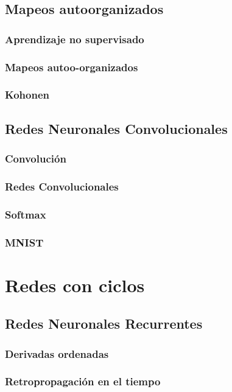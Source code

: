 \documentclass[12pt,openany]{book}
\begin{document}
\chapter{Mapeos autoorganizados}
\section{Aprendizaje no supervisado}
\section{Mapeos autoo-organizados}
\section{Kohonen}

\chapter{Redes Neuronales Convolucionales}
\section{Convolución}
\section{Redes Convolucionales}
\section{Softmax}
\section{MNIST}

\part{Redes con ciclos}
\chapter{Redes Neuronales Recurrentes}
\section{Derivadas ordenadas}
\section{Retropropagación en el tiempo}
\end{document}
